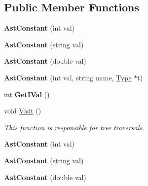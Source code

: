 \subsection*{Public Member Functions}
\begin{DoxyCompactItemize}
\item 
\hypertarget{classAstConstant_ab3d7bb141b6d2650498569fa7742237f}{{\bfseries Ast\-Constant} (int val)}\label{classAstConstant_ab3d7bb141b6d2650498569fa7742237f}

\item 
\hypertarget{classAstConstant_a071adbaa9ea9ad30cde38d68b4182cd9}{{\bfseries Ast\-Constant} (string val)}\label{classAstConstant_a071adbaa9ea9ad30cde38d68b4182cd9}

\item 
\hypertarget{classAstConstant_aef9142c2750c7ad8e83183c7b8ade0e8}{{\bfseries Ast\-Constant} (double val)}\label{classAstConstant_aef9142c2750c7ad8e83183c7b8ade0e8}

\item 
\hypertarget{classAstConstant_a9ceaff3b1de813268a88d7fded0aeb0c}{{\bfseries Ast\-Constant} (int val, string name, \hyperlink{classType}{Type} $\ast$t)}\label{classAstConstant_a9ceaff3b1de813268a88d7fded0aeb0c}

\item 
\hypertarget{classAstConstant_af9d81586158302f949f98f21bf4e8f5d}{int {\bfseries Get\-I\-Val} ()}\label{classAstConstant_af9d81586158302f949f98f21bf4e8f5d}

\item 
void \hyperlink{classAstConstant_ac13b7246f9d646a5ff00efee4c39bc6b}{Visit} ()
\begin{DoxyCompactList}\small\item\em This function is responsible for tree traversals. \end{DoxyCompactList}\item 
\hypertarget{classAstConstant_ab3d7bb141b6d2650498569fa7742237f}{{\bfseries Ast\-Constant} (int val)}\label{classAstConstant_ab3d7bb141b6d2650498569fa7742237f}

\item 
\hypertarget{classAstConstant_a071adbaa9ea9ad30cde38d68b4182cd9}{{\bfseries Ast\-Constant} (string val)}\label{classAstConstant_a071adbaa9ea9ad30cde38d68b4182cd9}

\item 
\hypertarget{classAstConstant_aef9142c2750c7ad8e83183c7b8ade0e8}{{\bfseries Ast\-Constant} (double val)}\label{classAstConstant_aef9142c2750c7ad8e83183c7b8ade0e8}


\end{DoxyCompactItemize}
